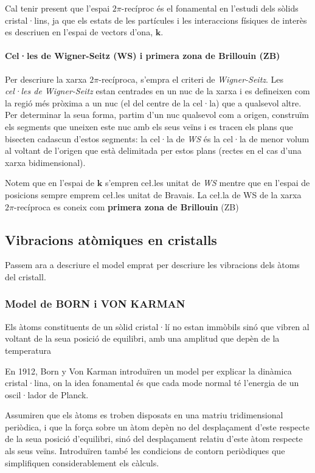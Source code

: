 \documentclass[12pt]{article} %
\let\vec\mathbf %
\begin{document}
Cal tenir present que l'espai $2\pi$-recíproc és el fonamental en l'estudi dels sòlids cristal·lins, ja que els estats de les partícules i les interaccions físiques de interès es descriuen en l'espai de vectors d'ona, $\vec k$.


\paragraph{Cel·les de Wigner-Seitz (WS) i primera zona de Brillouin (ZB)}

Per descriure la xarxa $2\pi$-recíproca, s'empra el criteri de \textit{Wigner-Seitz}. Les \textit{cel·les de Wigner-Seitz} estan centrades en un nuc de la xarxa i es defineixen com la regió més pròxima a un nuc (el del centre de la cel·la) que a qualsevol altre. Per determinar la seua forma, partim d'un nuc qualsevol com a origen, construïm els segments que uneixen este nuc amb els seus veïns i es tracen els plans que bisecten cadascun d'estos segments: la cel·la de \emph{WS} és la cel·la de menor volum al voltant de l'origen que està delimitada per estos plans (rectes en el cas d'una xarxa bidimensional).

Notem que en l'espai de $\vec k$ s'empren ce\l.les unitat de \emph{WS} mentre que en l'espai de posicions sempre emprem ce\l.les unitat de Bravais.
La ce\l.la de WS de la xarxa $2\pi$-recíproca es coneix com \textbf{primera zona de Brillouin} (ZB)


\subsection{Vibracions atòmiques en cristalls}
Passem ara a descriure el model emprat per descriure les vibracions dels àtoms del cristall.
\subsubsection{Model de BORN i VON KARMAN}
Els àtoms constituents de un sòlid cristal·lí no estan immòbils sinó que vibren al voltant de la seua posició de equilibri, amb una amplitud que depèn de la temperatura 

En 1912, Born y Von Karman \cite{Born:1912:SRG} introduïren un model per explicar la dinàmica cristal·lina, on la idea fonamental és que cada mode normal té l'energia de un oscil·lador de Planck.

Assumiren que els àtoms es troben disposats en una matriu tridimensional periòdica, i que la força sobre un àtom depèn no del desplaçament d'este respecte de la seua posició d'equilibri, sinó del desplaçament relatiu d'este àtom respecte als seus veïns. Introduïren també les condicions de contorn periòdiques que simplifiquen considerablement els càlculs. 
 
\end{document}
